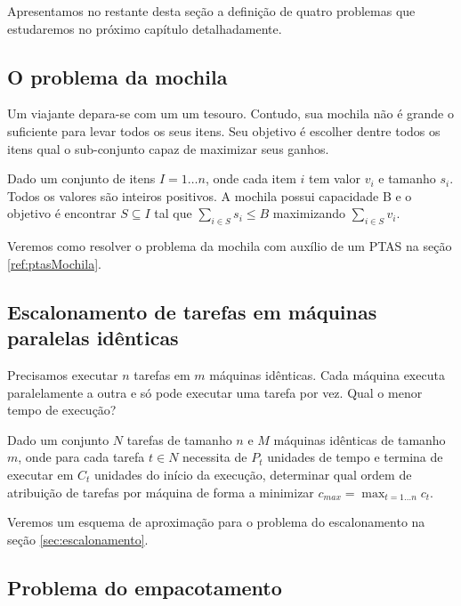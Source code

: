 Apresentamos no restante desta seção a definição de quatro problemas que estudaremos no próximo capítulo detalhadamente.

\subsection{O problema da mochila}
\label{sec:defmochila}

Um viajante depara-se com um um tesouro. Contudo, sua mochila não é grande o suficiente para levar todos os seus itens. Seu objetivo é escolher dentre todos os itens qual o sub-conjunto capaz de maximizar seus ganhos.

\begin{definition}
Dado um conjunto de itens $I = {1 \ldots n}$, onde cada item $i$ tem valor $v_i$ e tamanho $s_i$. Todos os valores são inteiros positivos. A mochila possui capacidade B e o objetivo é encontrar $ S \subseteq I $  tal que $\sum_{i \in S} s_i \leq  B$ maximizando $\sum_{i \in S} v_i$.
\end{definition}

Veremos como resolver o problema da mochila com auxílio de um PTAS na seção \ref{ref:ptasMochila}.

\subsection{Escalonamento de tarefas em máquinas paralelas idênticas}

Precisamos executar $n$ tarefas em $m$ máquinas idênticas. Cada máquina executa paralelamente a outra e só pode executar uma tarefa por vez. Qual o menor tempo de execução?

\begin{definition}
Dado um conjunto $N$ tarefas de tamanho $n$ e $M$ máquinas idênticas de tamanho $m$, onde para cada tarefa $t \in N$ necessita de $P_t$ unidades de tempo e termina de executar em $C_t$ unidades do início da execução, determinar qual ordem de atribuição de tarefas por máquina de forma a minimizar $c_{max} = \max_{t=1 \ldots n} c_t$.
\end{definition}

Veremos um esquema de aproximação para o problema do escalonamento na seção \ref{sec:escalonamento}.

\subsection{Problema do empacotamento}

